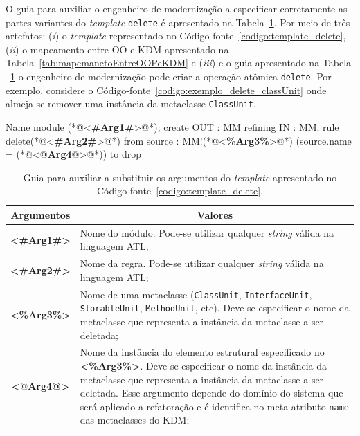 O guia para auxiliar o engenheiro de modernização a especificar corretamente as partes variantes do \textit{template} \texttt{delete} é apresentado na Tabela~\ref{tab:guia_template_operacao_delete}. Por meio de três artefatos: (\textit{i}) o \textit{template} representado no Código-fonte~\ref{codigo:template_delete}, (\textit{ii}) o mapeamento entre OO e KDM apresentado na Tabela~\ref{tab:mapemanetoEntreOOPeKDM} e (\textit{iii}) e o guia apresentado na Tabela ~\ref{tab:guia_template_operacao_delete} o engenheiro de modernização pode criar a operação atômica \texttt{delete}. Por exemplo, considere o Código-fonte~\ref{codigo:exemplo_delete_classUnit} onde almeja-se remover uma instância da metaclasse \texttt{ClassUnit}. 

\begin{codigo}[caption={[\textit{Template} ATL para realizar a operação atômica \textit{delete}.] \textit{Template} ATL para realizar a operação atômica \textit{delete}.},escapeinside={(*@}{@*)}, basicstyle=\footnotesize, label={codigo:template_delete}, language=ATL]{Name}
module (*@<\textbf{\#Arg1\#}>@*);
create OUT : MM refining IN : MM;
rule delete(*@<\textbf{\#Arg2\#}>@*) {
  from
      source : MM!(*@<\textbf{\%Arg3\%}>@*) (source.name = (*@<\textbf{$@$Arg4$@$}>@*))
  to
      drop
}
\end{codigo}

\begin{table}
\centering
\caption{Guia para auxiliar a substituir os argumentos do \textit{template} apresentado no Código-fonte~\ref{codigo:template_delete}.}
\label{tab:guia_template_operacao_delete}
\begin{tabular}{ | m{1.7cm} | m{12cm}| } 
\hline
\multicolumn{1}{|c|}{Argumentos}                                         & \multicolumn{1}{c|}{Valores} \\ \hline
\multicolumn{1}{|c|}{\textbf{<\#Arg1\#>}} & Nome do módulo. Pode-se utilizar qualquer \textit{string} válida na linguagem ATL; \\ 
\hline
\multicolumn{1}{|c|}{\textbf{<\#Arg2\#>}} & Nome da regra. Pode-se utilizar qualquer \textit{string} válida na linguagem ATL; \\  
\hline
\multicolumn{1}{|c|}{\textbf{<\%Arg3\%>}} & Nome de uma metaclasse (\texttt{ClassUnit}, \texttt{InterfaceUnit}, \texttt{StorableUnit}, \texttt{MethodUnit}, etc). Deve-se especificar o nome da metaclasse que representa a instância da metaclasse a ser deletada; \\ 
\hline
\multicolumn{1}{|c|}{\textbf{<$@$Arg4@>}} & Nome da instância do elemento estrutural especificado no \textbf{<\%Arg3\%>}. Deve-se especificar o nome da instância da metaclasse que representa a instância da metaclasse a ser deletada. Esse argumento depende do domínio do sistema que será aplicado a refatoração e é identifica no meta-atributo \texttt{name} das metaclasses do KDM;  \\ 
\hline
\end{tabular}
\end{table}

